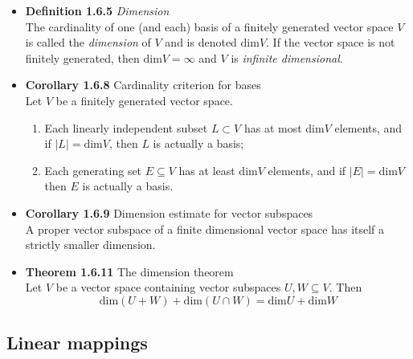 \documentclass[11pt,a4paper]{article}
\begin{document}
\begin{itemize}
    \item \textbf{Definition 1.6.5} \emph{Dimension} \\
        The cardinality of one (and each) basis of a finitely generated vector space $V$
        is called the \emph{dimension} of $V$ and is denoted $\text{dim}V$.
        If the vector space is not finitely generated, then $\text{dim}V = \infty$
        and $V$ is \emph{infinite dimensional}.

    \item \textbf{Corollary 1.6.8} Cardinality criterion for bases \\
        Let $V$ be a finitely generated vector space.
        \begin{enumerate}
            \item Each linearly independent subset $L \subset V$ has at most dim$V$ elements,
                and if $|L| = \text{dim}V$, then $L$ is actually a basis;
            \item Each generating set $E \subseteq V$ has at least dim$V$ elements,
                and if $|E| = \text{dim}V$ then $E$ is actually a basis.
        \end{enumerate}

    \item \textbf{Corollary 1.6.9} Dimension estimate for vector subspaces \\
        A proper vector subspace of a finite dimensional vector space has itself a strictly
        smaller dimension.

    \item \textbf{Theorem 1.6.11} The dimension theorem \\
        Let $V$ be a vector space containing vector subspaces $U, W \subseteq V$.  Then
        \[
            \text{dim}(U+W) + \text{dim}(U \cap W) = \text{dim}U + \text{dim}W
        \]

\end{itemize}

\subsection{Linear mappings}
\end{document}
